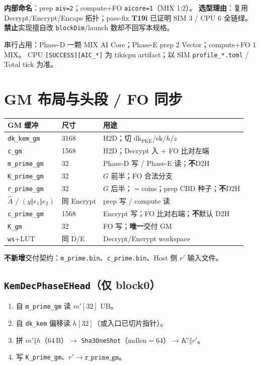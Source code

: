 \documentclass[UTF8,a4paper,11pt]{ctexart}
\begin{document}
\textbf{内部命名}：prep \texttt{aiv=2}；compute+FO \texttt{aicore=1}（MIX 1:2）。
\textbf{选型理由}：复用 Decrypt/Encrypt/Encaps 拓扑；pass-fix \textbf{T19i}
已证明 SIM 3 / CPU 6 全链绿。\textbf{禁止}实现擅自改 \texttt{blockDim}/launch
数却不回写本规格。

串行占用：Phase-D 一颗 MIX AI Core；Phase-E prep 2 Vector；compute+FO 1 MIX。
CPU \texttt{[SUCCESS][AIC\_*]} 为 tikicpu artifact；以 SIM
\texttt{profile\_*.toml} / Total tick 为准。

\section{GM 布局与头段 / FO 同步}
\label{sec:gm}

\begin{longtable}{@{}L{3.4cm}L{2.0cm}L{7.4cm}@{}}
\toprule
GM 缓冲 & 尺寸 & 用途 \\
\midrule
\texttt{dk\_kem\_gm} & 3168 & H2D；切 $\mathrm{dk}_{\mathrm{PKE}}$/$\mathrm{ek}$/$h$/$z$ \\
\texttt{c\_gm} & 1568 & H2D；Decrypt 入 + FO 比对左端 \\
\texttt{m\_prime\_gm} & 32 & Phase-D 写 / Phase-E 读；\textbf{不}D2H \\
\texttt{K\_prime\_gm} & 32 & $G$ 前半；FO 合法分支 \\
\texttt{r\_prime\_gm} & 32 & $G$ 后半；$=$coins；prep CBD 种子；\textbf{不}D2H \\
$\hat{A}$ / $(y\Vert e_1\Vert e_2)$ & 同 Encrypt & prep 写 / compute 读 \\
\texttt{c\_prime\_gm} & 1568 & Encrypt 写；FO 比对右端；\textbf{不}默认 D2H \\
\texttt{K\_gm} & 32 & FO 写；\textbf{唯一}交付 GM \\
\texttt{ws}+LUT & 同 D/E & Decrypt/Encrypt workspace \\
\bottomrule
\end{longtable}

\textbf{不新增}交付契约：\texttt{m\_prime.bin}、\texttt{c\_prime.bin}、Host 侧
$r'$ 输入文件。

\subsection{\texttt{KemDecPhaseEHead}（仅 block0）}

\begin{enumerate}
  \item 自 \texttt{m\_prime\_gm} 读 $m'[32]$ UB。
  \item 自 \texttt{dk\_kem} 偏移读 $h[32]$（或入口已切片指针）。
  \item 拼 $m'\Vert h$（64\,B）$\to$ \texttt{Sha3OneShot}（mdlen$=$64）$\to K'\Vert r'$。
  \item 写 \texttt{K\_prime\_gm}、$r'\to\texttt{r\_prime\_gm}$。
\end{enumerate}
\end{document}
